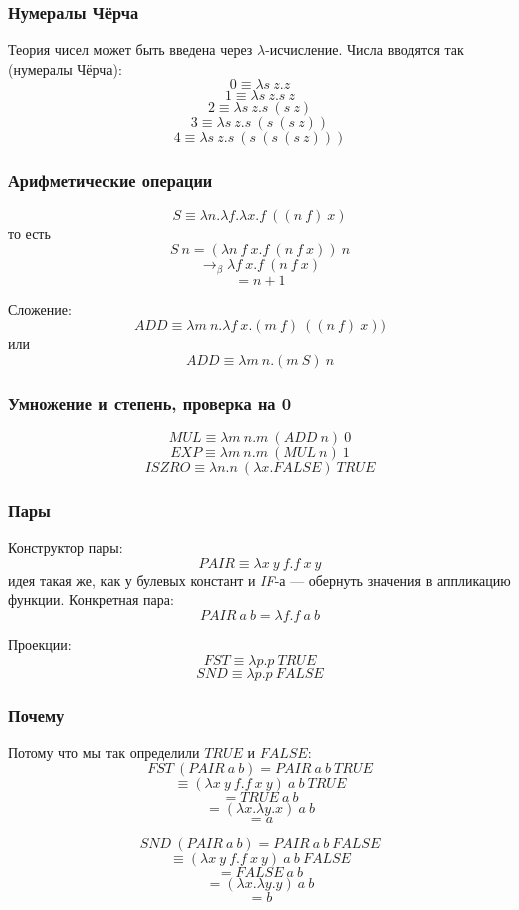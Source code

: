 \documentclass[xetex,mathserif,serif]{beamer}
\begin{document}
    \begin{frame}
        \frametitle{Нумералы Чёрча}
        Теория чисел может быть введена через $\lambda$-исчисление. Числа вводятся так (нумералы Чёрча):
        $$0 \equiv \lambda s\ z.z$$
        $$1 \equiv \lambda s\ z.s\ z$$
        $$2 \equiv \lambda s\ z.s\ (s\ z)$$
        $$3 \equiv \lambda s\ z.s\ (s\ (s\ z))$$
        $$4 \equiv \lambda s\ z.s\ (s\ (s\ (s\ z)))$$
    \end{frame}

    \begin{frame}
        \frametitle{Арифметические операции}
        $$S \equiv \lambda n.\lambda f.\lambda x.f\ ((n\ f)\ x)$$
        то есть
        $$S\ n = (\lambda n\ f\ x.f\ (n\ f\ x))\ n$$
        $$\rightarrow_\beta \lambda f\ x.f\ (n\ f\ x)$$
        $$= n + 1$$
        
        Сложение:
        $$ADD \equiv \lambda m\ n.\lambda f\ x.(m\ f)\ ((n\ f)\ x))$$
        или
        $$ADD \equiv \lambda m\ n.(m\ S)\ n$$
    \end{frame}

    \begin{frame}
        \frametitle{Умножение и степень, проверка на 0}
        $$MUL \equiv \lambda m\ n.m\ (ADD\ n)\ 0$$
        $$EXP \equiv \lambda m\ n.m\ (MUL\ n)\ 1$$
        $$ISZRO \equiv \lambda n.n\ (\lambda x.FALSE)\ TRUE$$
    \end{frame}

    \begin{frame}
        \frametitle{Пары}
        Конструктор пары:
        $$PAIR \equiv \lambda x\ y\ f.f\ x\ y$$
        идея такая же, как у булевых констант и \textit{IF}-а --- обернуть значения в аппликацию функции. Конкретная пара:
        $$PAIR\ a\ b = \lambda f.f\ a\ b$$
        
        Проекции:
        $$FST \equiv \lambda p.p\ TRUE$$
        $$SND \equiv \lambda p.p\ FALSE$$
    \end{frame}

    \begin{frame}
        \frametitle{Почему}
        Потому что мы так определили $TRUE$ и $FALSE$:
        $$FST\ (PAIR\ a\ b) = PAIR\ a\ b\ TRUE$$
        $$\equiv (\lambda x\ y\ f.f\ x\ y)\ a\ b\ TRUE$$
        $$= TRUE\ a\ b$$
        $$= (\lambda x.\lambda y.x)\ a\ b$$
        $$= a$$

        $$SND\ (PAIR\ a\ b) = PAIR\ a\ b\ FALSE$$
        $$\equiv (\lambda x\ y\ f.f\ x\ y)\ a\ b\ FALSE$$
        $$= FALSE\ a\ b$$
        $$= (\lambda x.\lambda y.y)\ a\ b$$
        $$= b$$
    \end{frame}
\end{document}
